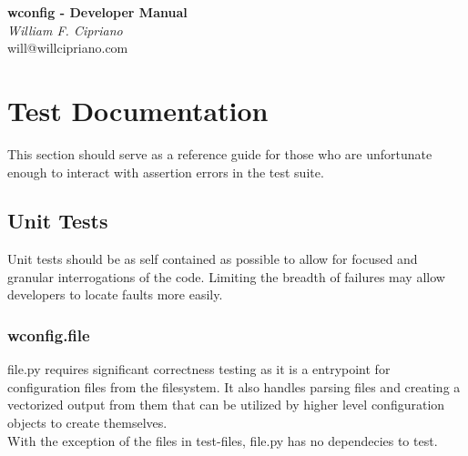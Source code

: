 \documentclass{article}
\begin{document}


\begin{titlepage}
   \begin{center}
      \Large\textbf{wconfig - Developer Manual}\\
      \large\textit{William F. Cipriano}\\
      \tiny{will@willcipriano.com}
   \end{center}
\end{titlepage}



\tableofcontents

\listoftables


\newpage



\section{Test Documentation}
This section should serve as a reference guide for those who are unfortunate enough to interact with assertion errors in the test suite.

\subsection{Unit Tests}
Unit tests should be as self contained as possible to allow for focused and granular interrogations of the code. Limiting the breadth of failures may allow developers to locate faults more easily.

\subsubsection{wconfig.file}
file.py requires significant correctness testing as it is a entrypoint for configuration files from the filesystem. It also handles parsing files and creating a vectorized output from them that can be utilized by higher level configuration objects to create themselves.\\
With the exception of the files in test-files, file.py has no dependecies to test.\\
\end{document}
